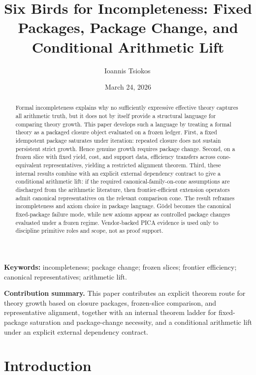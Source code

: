 \documentclass[11pt]{article}
\title{Six Birds for Incompleteness: Fixed Packages, Package Change, and Conditional Arithmetic Lift}
\author{Ioannis Tsiokos\,\orcidlink{0009-0009-7659-5964}}
\date{March 24, 2026}
\begin{document}
\maketitle
\thispagestyle{firstpage}

\begin{abstract}
Formal incompleteness explains why no sufficiently expressive effective theory captures all arithmetic truth, but it does not by itself provide a structural language for comparing theory growth. This paper develops such a language by treating a formal theory as a packaged closure object evaluated on a frozen ledger. First, a fixed idempotent package saturates under iteration: repeated closure does not sustain persistent strict growth. Hence genuine growth requires package change. Second, on a frozen slice with fixed yield, cost, and support data, efficiency transfers across cone-equivalent representatives, yielding a restricted alignment theorem. Third, these internal results combine with an explicit external dependency contract to give a conditional arithmetic lift: if the required canonical-family-on-cone assumptions are discharged from the arithmetic literature, then frontier-efficient extension operators admit canonical representatives on the relevant comparison cone. The result reframes incompleteness and axiom choice in package language. G\"odel becomes the canonical fixed-package failure mode, while new axioms appear as controlled package changes evaluated under a frozen regime. Vendor-backed PICA evidence is used only to discipline primitive roles and scope, not as proof support.
\end{abstract}

\medskip

\noindent\textbf{Keywords:} incompleteness; package change; frozen slices; frontier efficiency; canonical representatives; arithmetic lift.

\medskip

\noindent\textbf{Contribution summary.} This paper contributes an explicit theorem route for theory growth based on closure packages, frozen-slice comparison, and representative alignment, together with an internal theorem ladder for fixed-package saturation and package-change necessity, and a conditional arithmetic lift under an explicit external dependency contract.

\bigskip
 
\section{Introduction}\label{sec:introduction}
\end{document}
